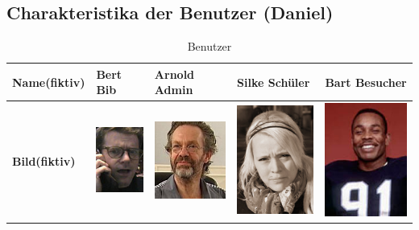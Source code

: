 \documentclass[fontsize=12pt,paper=a4,twoside]{scrartcl}
\begin{document}
\subsection{Charakteristika der Benutzer (Daniel)} \label{subsec:Benutzer} 
\begin{table}
	[H] \caption{Benutzer} \label{benutzer} 
	\begin{tabular}
		{|p{}||p{2,8cm}|p{}|p{}|p{}|} \hline \textbf{Name(fiktiv)} & Bert Bib & Arnold Admin & Silke Schüler & Bart Besucher\\
		\hline \textbf{Bild(fiktiv)} & 
		\includegraphics[scale=1]{bib.jpg} & 
		\includegraphics[scale=0.6]{admin.jpg} & 
		\includegraphics[scale=0.45]{reg.jpg} & 
		\includegraphics[scale=0.45]{unreg.jpg} \\

\end{tabular}
\end{table}
\end{document}
